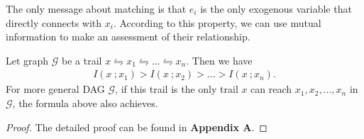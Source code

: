 \documentclass[twoside,11pt]{article}
\begin{document}





The only message about matching is that $e_i$ is the only exogenous variable that directly connects with $x_i$. According to this property, we can use mutual information to make an assessment of their relationship.

\begin{theorem}
\label{trail MI}
Let graph $\mathcal G$ be a trail $x\leftrightharpoons x_1\leftrightharpoons ... \leftrightharpoons x_n$. Then we have
\begin{align*}
    I(x\ ;x_1)>I(x\ ;x_2)>...>I(x\ ;x_n).
\end{align*}
For more general DAG $\mathcal G$, if this trail is the only trail $x$ can reach $x_1, x_2,..., x_n$ in $\mathcal G$, the formula above also achieves.
\end{theorem}

\begin{proof}
    The detailed proof can be found in \textbf{Appendix A}.
\end{proof}
\end{document}
